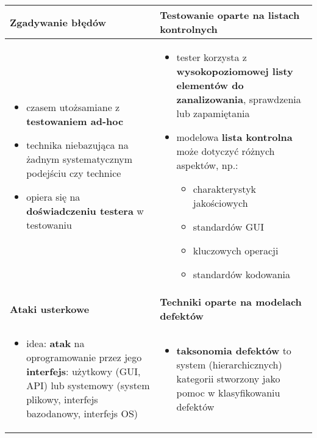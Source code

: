 \documentclass[../main.tex]{subfiles}
\begin{document}
    \begin{table}[H]
        \begin{center}
            \begin{tabular}{| p{8cm} | p{8cm} |}
                \hline
                \textbf{Zgadywanie błędów} & \textbf{Testowanie oparte na listach kontrolnych} \\
                \hline
                \begin{itemize}
                    \item czasem utożsamiane z \textbf{testowaniem ad-hoc}
                    \item technika niebazująca na żadnym systematycznym podejściu czy technice
                    \item opiera się na \textbf{doświadczeniu testera} w testowaniu
                \end{itemize}
                &
                \begin{itemize}
                    \item tester korzysta z \textbf{wysokopoziomowej listy elementów do
                    zanalizowania}, sprawdzenia lub zapamiętania
                    \item modelowa \textbf{lista kontrolna} może dotyczyć różnych aspektów, np.:
                    \begin{itemize}
                        \item charakterystyk jakościowych
                        \item standardów GUI
                        \item kluczowych operacji
                        \item standardów kodowania
                    \end{itemize}
                \end{itemize} \\
                \hline
                \hline
                \textbf{Ataki usterkowe}   & \textbf{Techniki oparte na modelach defektów}     \\
                \hline
                \begin{itemize}
                    \item idea: \textbf{atak} na oprogramowanie przez jego \textbf{interfejs}: użytkowy (GUI, API)
                    lub systemowy (system plikowy, interfejs bazodanowy, interfejs OS)
                \end{itemize}
                &
                \begin{itemize}
                    \item \textbf{taksonomia defektów} to system (hierarchicznych) kategorii
                    stworzony jako pomoc w klasyfikowaniu defektów
                \end{itemize} \\
                \hline
            \end{tabular}
        \end{center}
    \end{table}
\end{document}
